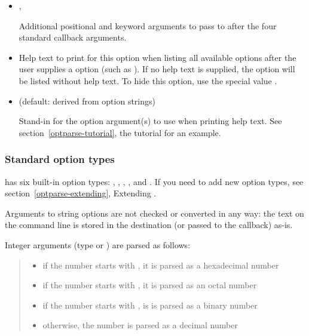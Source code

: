 \begin{itemize}
\item {} 
, 

Additional positional and keyword arguments to pass to 
after the four standard callback arguments.

\item {} 

Help text to print for this option when listing all available options
after the user supplies a  option (such as ).
If no help text is supplied, the option will be listed without help
text.  To hide this option, use the special value .

\item {} 
 (default: derived from option strings)

Stand-in for the option argument(s) to use when printing help text.
See section~\ref{optparse-tutorial}, the tutorial for an example.

\end{itemize}


\subsubsection{Standard option types\label{optparse-standard-option-types}}

 has six built-in option types: , , ,
,  and .  If you need to add new option
types, see section~\ref{optparse-extending}, Extending .

Arguments to string options are not checked or converted in any way: the
text on the command line is stored in the destination (or passed to the
callback) as-is.

Integer arguments (type  or ) are parsed as follows:
\begin{quote}
\begin{itemize}
\item {} 
if the number starts with , it is parsed as a hexadecimal number

\item {} 
if the number starts with , it is parsed as an octal number

\item {} 
if the number starts with , is is parsed as a binary number

\item {} 
otherwise, the number is parsed as a decimal number

\end{itemize}
\end{quote}

